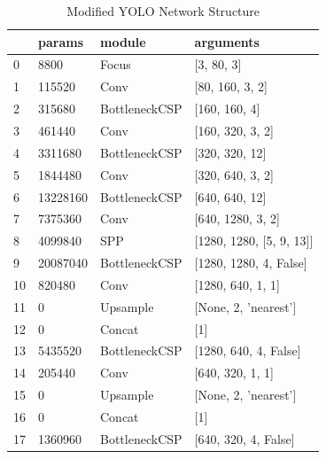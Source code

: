 \begin{table}
  \centering
  \caption[Modified YOLO Network Structure]{Modified YOLO Network Structure}
  \label{tab:yolo_network_mod}
    \begin{tabular}{p{} p{} p{} p{}}
      \toprule
        &     params & module                  &  arguments                     \\
     \hline
      0 &       8800 & Focus                   &  [3, 80, 3]                    \\
      1 &     115520 & Conv                    &  [80, 160, 3, 2]               \\
      2 &     315680 & BottleneckCSP           &  [160, 160, 4]                 \\
      3 &     461440 & Conv                    &  [160, 320, 3, 2]              \\
      4 &    3311680 & BottleneckCSP           &  [320, 320, 12]                \\
      5 &    1844480 & Conv                    &  [320, 640, 3, 2]              \\
      6 &   13228160 & BottleneckCSP           &  [640, 640, 12]                \\
      7 &    7375360 & Conv                    &  [640, 1280, 3, 2]             \\
      8 &    4099840 & SPP                     &  [1280, 1280, [5, 9, 13]]      \\
      9 &   20087040 & BottleneckCSP           &  [1280, 1280, 4, False]        \\
     10 &     820480 & Conv                    &  [1280, 640, 1, 1]             \\
     11 &          0 & Upsample                &  [None, 2, 'nearest']          \\
     12 &          0 & Concat                  &  [1]                           \\
     13 &    5435520 & BottleneckCSP           &  [1280, 640, 4, False]         \\
     14 &     205440 & Conv                    &  [640, 320, 1, 1]              \\
     15 &          0 & Upsample                &  [None, 2, 'nearest']          \\
     16 &          0 & Concat                  &  [1]                           \\
     17 &    1360960 & BottleneckCSP           &  [640, 320, 4, False]          \\

\end{tabular}
\end{table}
